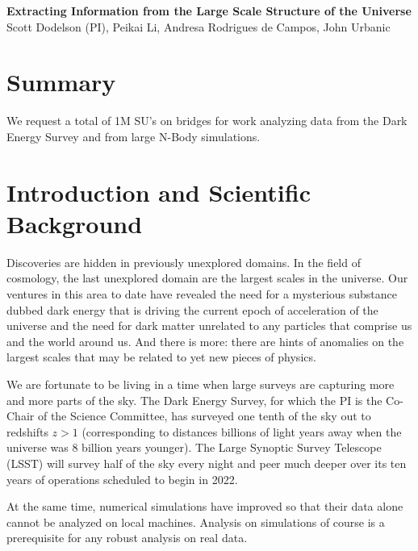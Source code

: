 \documentclass[12pt]{article}
\begin{document}
\topmargin=-2.105cm
\oddsidemargin=-0.1cm
\evensidemargin=0cm

\begin{center}
{\bf Extracting Information from the Large Scale Structure of the Universe\\}
Scott Dodelson (PI), Peikai Li, Andresa Rodrigues de Campos, John Urbanic
\end{center}

\begin{small}


\section*{Summary} We request a total of 1M SU's on bridges for work analyzing data from the Dark Energy Survey and from large N-Body simulations.

\section{Introduction and Scientific Background}

Discoveries are hidden in previously unexplored domains. In the field of cosmology, the last unexplored domain are the largest scales in the universe. Our ventures in this area to date have revealed the need for a mysterious substance dubbed dark energy that is driving the current epoch of acceleration of the universe and the need for dark matter unrelated to any particles that comprise us and the world around us. And there is more: there are hints of anomalies on the largest scales that may be related to yet new pieces of physics. 

We are fortunate to be living in a time when large surveys are capturing more and more parts of the sky. The Dark Energy Survey, for which the PI is the Co-Chair of the Science Committee, has surveyed one tenth of the sky out to redshifts $z>1$ (corresponding to distances billions of light years away when the universe was 8 billion years younger). The Large Synoptic Survey Telescope (LSST) will survey half of the sky every night and peer much deeper over its ten years of operations scheduled to begin in 2022. 

At the same time, numerical simulations have improved so that their data alone cannot be analyzed on local machines. Analysis on simulations of course is a prerequisite for any robust analysis on real data. 


\end{small}
\end{document}
